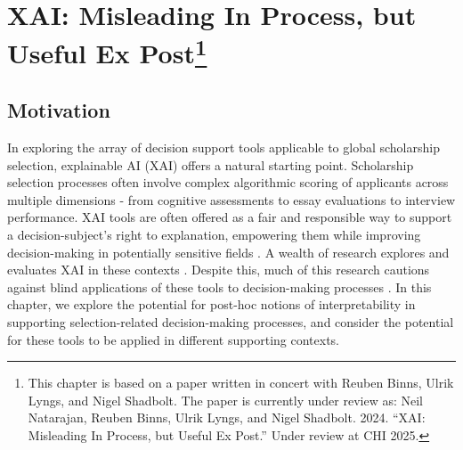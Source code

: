 \chapter[XAI]{\label{ch:xai}XAI: Misleading In Process, but Useful Ex Post\footnote{This chapter is based on a paper written in concert with Reuben Binns, Ulrik Lyngs, and Nigel Shadbolt. The paper is currently under review as: Neil Natarajan, Reuben Binns, Ulrik Lyngs, and Nigel Shadbolt. 2024. ``XAI: Misleading In Process, but Useful Ex Post.'' Under review at CHI 2025.}}

\minitoc


\section{Motivation}
In exploring the array of decision support tools applicable to global scholarship selection, explainable AI (XAI) offers a natural starting point. Scholarship selection processes often involve complex algorithmic scoring of applicants across multiple dimensions - from cognitive assessments to essay evaluations to interview performance. XAI tools are often offered as a fair and responsible way to support a decision-subject's right to explanation, empowering them while improving decision-making in potentially sensitive fields \cite{Goodman_Flaxman_2017}. A wealth of research explores and evaluates XAI in these contexts \cite{molnar_interpretable_2019,barocas_hidden_2020,wachter_counterfactual_2017,Barocas_Hood_Ziewitz_2013,raghavan2020mitigating}. Despite this, much of this research cautions against blind applications of these tools to decision-making processes \cite{Lipton,miller_explainable_2023,kumar_problems_2020,Bastounis_Campodonico_vanderSchaar_Adcock_Hansen_2024}. In this chapter, we explore the potential for post-hoc notions of interpretability in supporting selection-related decision-making processes, and consider the potential for these tools to be applied in different supporting contexts.

